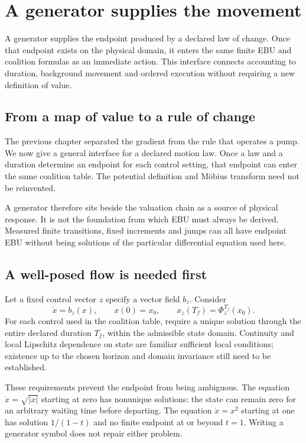 \chapter{A generator supplies the movement}\label{ch:generators}

A generator supplies the endpoint produced by a declared law of change. Once that endpoint exists on the physical domain, it enters the same finite EBU and coalition formulas as an immediate action. This interface connects accounting to duration, background movement and ordered execution without requiring a new definition of value.


\section{From a map of value to a rule of change}
The previous chapter separated the gradient from the rule that operates a pump. We now give a general interface for a declared motion law. Once a law and a duration determine an endpoint for each control setting, that endpoint can enter the same coalition table. The potential definition and Möbius transform need not be reinvented.

A generator therefore sits beside the valuation chain as a source of physical response. It is not the foundation from which EBU must always be derived. Measured finite transitions, fixed increments and jumps can all have endpoint EBU without being solutions of the particular differential equation used here.

\section{A well-posed flow is needed first}
Let a fixed control vector $z$ specify a vector field $b_z$. Consider
\begin{equation}\label{eq:flow}
 \dot x=b_z(x),\qquad x(0)=x_0,
 \qquad x_z({T_f})=\Phi_z^{T_f}(x_0).
\end{equation}
For each control used in the coalition table, require a unique solution through the entire declared duration ${T_f}$, within the admissible state domain. Continuity and local Lipschitz dependence on state are familiar sufficient local conditions; existence up to the chosen horizon and domain invariance still need to be established.

These requirements prevent the endpoint from being ambiguous. The equation $\dot x=\sqrt{|x|}$ starting at zero has nonunique solutions: the state can remain zero for an arbitrary waiting time before departing. The equation $\dot x=x^2$ starting at one has solution $1/(1-t)$ and no finite endpoint at or beyond $t=1$. Writing a generator symbol does not repair either problem.

